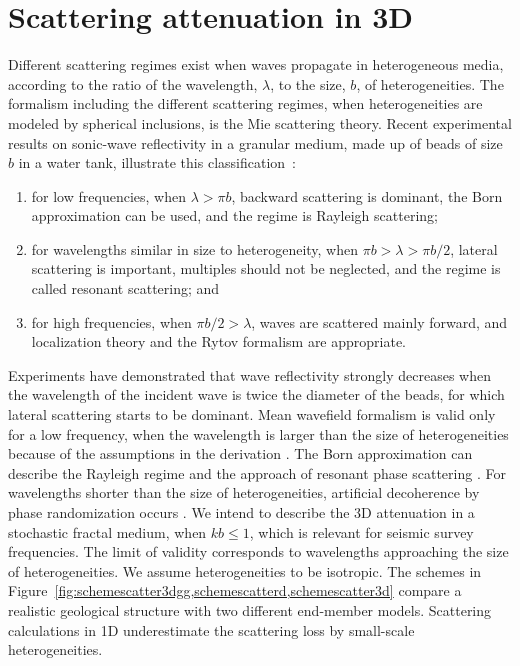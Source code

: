 \section{Scattering attenuation in 3D}


Different scattering regimes exist when waves propagate in heterogeneous media,
according to the ratio of the wavelength, $\lambda$, to the size, $b$, of heterogeneities.
The formalism including the different scattering regimes,
when heterogeneities are modeled by spherical inclusions,
is the Mie scattering theory.
Recent experimental results 
\cite[]{Legonidec_G07} 
on sonic-wave reflectivity in a granular medium,
made up of beads of size $b$ in a water tank, illustrate this classification~:
\begin{enumerate}
\item for low frequencies, when $\lambda>\pi b$, backward scattering is dominant,
the Born approximation can be used, and the regime is Rayleigh scattering;
\item for wavelengths similar in size to heterogeneity, when $\pi b>\lambda>\pi b/2$,
lateral scattering is important, multiples should not be neglected,
and the regime is called resonant scattering; and
\item for high frequencies, when $\pi b/2>\lambda$, waves are scattered mainly forward, and
localization theory and the Rytov formalism are appropriate.
\end{enumerate}
Experiments have demonstrated that wave reflectivity strongly decreases 
when the wavelength of the incident wave is twice the diameter of the beads,
for which lateral scattering starts to be dominant.
Mean wavefield formalism is valid only for a low frequency,
when the wavelength is larger than the size of heterogeneities
because of the assumptions in the derivation \cite[]{Karal_K64}.
The Born approximation can describe the Rayleigh regime and the approach of resonant phase scattering \cite[]{Frankel_C86,Sato_F98}.
For wavelengths shorter than the size of heterogeneities, 
artificial decoherence by phase randomization occurs \cite[]{Wu_82,Sato_F98}.
We intend to describe the 3D attenuation in a stochastic fractal medium,
when $kb\leq1$, which is relevant for seismic survey frequencies.
The limit of validity corresponds to wavelengths approaching the size of heterogeneities.
We assume heterogeneities to be isotropic.
The schemes in Figure~\ref{fig:schemescatter3dgg,schemescatterd,schemescatter3d}
compare a realistic geological structure
with two different end-member models.
Scattering calculations in 1D underestimate the scattering loss by small-scale heterogeneities.


